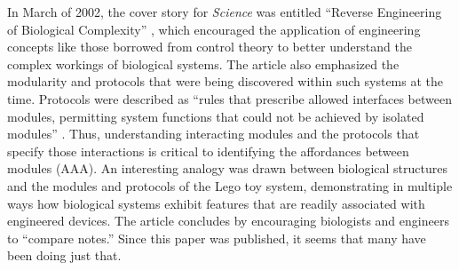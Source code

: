 In March of 2002, the cover story for \textit{Science} was entitled
``Reverse Engineering of Biological Complexity'' \citep{csetedoyle2002},
which encouraged the application of engineering concepts like those
borrowed from control theory to better understand the complex workings
of biological systems. The article also emphasized the modularity and
protocols that were being discovered within such systems at the time.
Protocols were described as ``rules that prescribe allowed interfaces
between modules, permitting system functions that could not be achieved
by isolated modules'' \citep[][p.~1666]{csetedoyle2002}.  Thus, understanding interacting modules and the
protocols that specify those interactions is critical to identifying
the affordances between modules (AAA). An interesting analogy was drawn
between biological structures and the modules and protocols of the Lego
toy system, demonstrating in multiple ways how biological systems
exhibit features that are readily associated with engineered devices.
The article concludes by encouraging biologists and engineers to
``compare notes.'' Since this paper was published, it seems that many
have been doing just that. 

